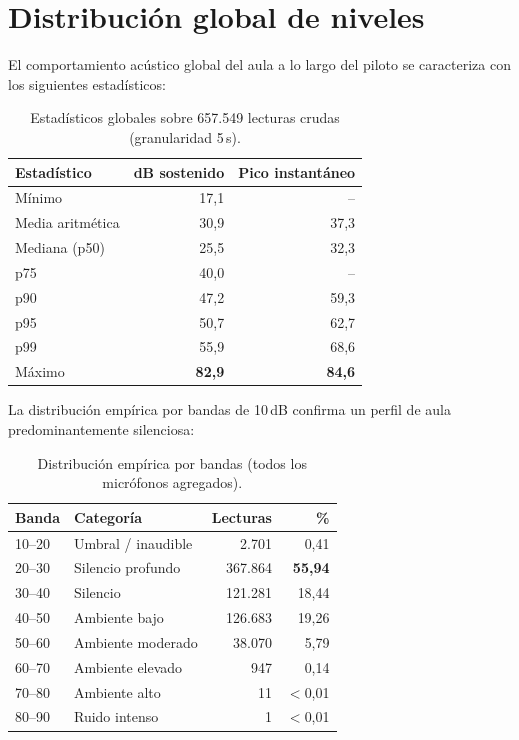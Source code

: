 \documentclass[11pt,a4paper,openany]{report}
\begin{document}
\section{Distribuci\'on global de niveles}

El comportamiento ac\'ustico global del aula a lo largo del piloto se caracteriza con los siguientes estad\'isticos:

\begin{table}[H]
\centering
{}
\begin{tabularx}{\textwidth}{X r r}
\toprule
\rowcolor{TableHead}
\textbf{Estad\'istico} & \textbf{dB sostenido} & \textbf{Pico instant\'aneo} \\ \midrule
M\'inimo                  & 17,1  & --   \\
Media aritm\'etica         & 30,9  & 37,3 \\
Mediana (p50)             & 25,5  & 32,3 \\
p75                       & 40,0  & --   \\
p90                       & 47,2  & 59,3 \\
p95                       & 50,7  & 62,7 \\
p99                       & 55,9  & 68,6 \\
M\'aximo                  & \textbf{82,9} & \textbf{84,6} \\ \bottomrule
\end{tabularx}
\caption{Estad\'isticos globales sobre 657.549 lecturas crudas (granularidad 5\,s).}
\label{tab:estadisticos-globales}
\end{table}

La distribuci\'on emp\'irica por bandas de 10\,dB confirma un perfil de aula predominantemente silenciosa:

\begin{table}[H]
\centering
{}
\begin{tabularx}{\textwidth}{l X r r}
\toprule
\rowcolor{TableHead}
\textbf{Banda} & \textbf{Categor\'ia} & \textbf{Lecturas} & \textbf{\%} \\ \midrule
10--20  & Umbral / inaudible    &       2.701 &  0,41 \\
20--30  & Silencio profundo     &     367.864 & \textbf{55,94} \\
30--40  & Silencio              &     121.281 & 18,44 \\
40--50  & Ambiente bajo         &     126.683 & 19,26 \\
50--60  & Ambiente moderado     &      38.070 &  5,79 \\
60--70  & Ambiente elevado      &         947 &  0,14 \\
70--80  & Ambiente alto         &          11 & $<$0,01 \\
80--90  & Ruido intenso         &           1 & $<$0,01 \\ \bottomrule
\end{tabularx}
\caption{Distribuci\'on emp\'irica por bandas (todos los micr\'ofonos agregados).}
\label{tab:distribucion-bandas}
\end{table}
\end{document}
